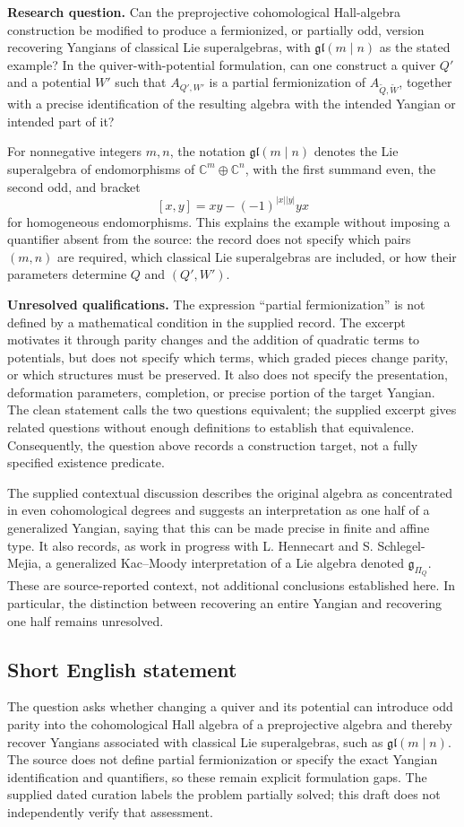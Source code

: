 \documentclass[11pt]{article}
\newcommand{\C}{\mathbb{C}}
\begin{document}
\textbf{Research question.} Can the preprojective cohomological Hall-algebra construction be modified to produce a fermionized, or partially odd, version recovering Yangians of classical Lie superalgebras, with \(\mathfrak{gl}(m\mid n)\) as the stated example? In the quiver-with-potential formulation, can one construct a quiver \(Q'\) and a potential \(W'\) such that \(A_{Q',W'}\) is a partial fermionization of \(A_{\widetilde Q,\widetilde W}\), together with a precise identification of the resulting algebra with the intended Yangian or intended part of it?

For nonnegative integers \(m,n\), the notation \(\mathfrak{gl}(m\mid n)\) denotes the Lie superalgebra of endomorphisms of \(\C^m\oplus\C^n\), with the first summand even, the second odd, and bracket
\[
[x,y]=xy-(-1)^{|x||y|}yx
\]
for homogeneous endomorphisms. This explains the example without imposing a quantifier absent from the source: the record does not specify which pairs \((m,n)\) are required, which classical Lie superalgebras are included, or how their parameters determine \(Q\) and \((Q',W')\).

\textbf{Unresolved qualifications.} The expression ``partial fermionization'' is not defined by a mathematical condition in the supplied record. The excerpt motivates it through parity changes and the addition of quadratic terms to potentials, but does not specify which terms, which graded pieces change parity, or which structures must be preserved. It also does not specify the presentation, deformation parameters, completion, or precise portion of the target Yangian. The clean statement calls the two questions equivalent; the supplied excerpt gives related questions without enough definitions to establish that equivalence. Consequently, the question above records a construction target, not a fully specified existence predicate.

The supplied contextual discussion describes the original algebra as concentrated in even cohomological degrees and suggests an interpretation as one half of a generalized Yangian, saying that this can be made precise in finite and affine type. It also records, as work in progress with L. Hennecart and S. Schlegel-Mejia, a generalized Kac--Moody interpretation of a Lie algebra denoted \(\mathfrak g_{\Pi_Q}\). These are source-reported context, not additional conclusions established here. In particular, the distinction between recovering an entire Yangian and recovering one half remains unresolved.
\subsection{Short English statement}
The question asks whether changing a quiver and its potential can introduce odd parity into the cohomological Hall algebra of a preprojective algebra and thereby recover Yangians associated with classical Lie superalgebras, such as \(\mathfrak{gl}(m\mid n)\). The source does not define partial fermionization or specify the exact Yangian identification and quantifiers, so these remain explicit formulation gaps. The supplied dated curation labels the problem partially solved; this draft does not independently verify that assessment.
\end{document}
